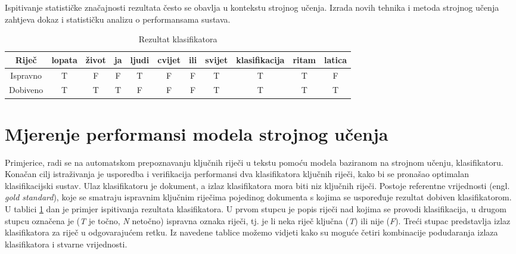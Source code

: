 Ispitivanje statističke značajnosti rezultata često se obavlja u kontekstu strojnog učenja. Izrada novih tehnika i metoda strojnog učenja zahtjeva dokaz i statističku analizu o performansama sustava. 

\begin{table}
\centering
\begin{tabular}{|c||c|c|c|c|c|c|c|c|c|c|}
\hline
Riječ & lopata & život & ja & ljudi & cvijet & ili & svijet & klasifikacija & ritam & latica \\ \hline
Ispravno & T & F & F & T & F & F & T & T & T & F \\ \hline
Dobiveno & T & T & T & F & F & F & T & T & T & T \\ \hline
\end{tabular}
\caption{Rezultat klasifikatora}
\label{tab:usporedba_predict_gold}
\end{table}

\section{Mjerenje performansi modela strojnog učenja}

Primjerice, radi se na automatskom prepoznavanju ključnih riječi u tekstu pomoću modela baziranom na strojnom učenju, klasifikatoru. Konačan cilj istraživanja je usporedba i verifikacija performansi dva klasifikatora ključnih riječi, kako bi se pronašao optimalan klasifikacijski sustav. Ulaz klasifikatoru je dokument, a izlaz klasifikatora mora biti niz ključnih riječi. Postoje referentne vrijednosti (engl.\,\textit{gold standard}), koje se smatraju ispravnim ključnim riječima pojedinog dokumenta s kojima se uspoređuje rezultat dobiven klasifikatorom. U tablici \ref{tab:usporedba_predict_gold} dan je primjer ispitivanja rezultata klasifikatora. U prvom stupcu je popis riječi nad kojima se provodi klasifikacija, u drugom stupcu označena je (\textit{T} je točno, \textit{N} netočno) ispravna oznaka riječi, tj. je li neka riječ ključna (\textit{T}) ili nije (\textit{F}). Treći stupac predstavlja izlaz klasifikatora za riječ u odgovarajućem retku. Iz navedene tablice možemo vidjeti kako su moguće četiri kombinacije podudaranja izlaza klasifikatora i stvarne vrijednosti. 

